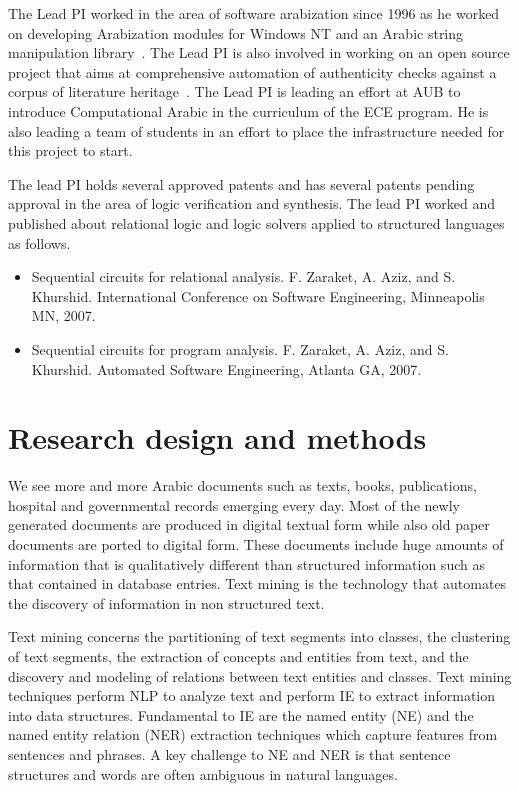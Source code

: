 \documentclass[12pt]{article}
\begin{document}
The Lead PI worked in the area of software arabization since 1996 
as he worked on developing Arabization modules for Windows NT 
and an Arabic string manipulation library~\cite{Zar96}. 
The Lead PI is also involved in working on an open source 
project that aims at comprehensive automation of authenticity 
checks against a corpus of literature heritage~\cite{Zaraket06}.
The Lead PI is leading an effort at AUB to introduce 
Computational Arabic in the curriculum of the ECE program. 
He is also leading a team of students in an effort to place 
the infrastructure needed for this project to start. 

The lead PI holds several approved patents and has several 
patents pending approval in the area of logic verification 
and synthesis.
The lead PI worked and published about relational logic and 
logic solvers applied to structured languages as follows.
\begin{itemize}
\item Sequential circuits for relational analysis. F. Zaraket, A. Aziz, and S. Khurshid. International Conference on Software Engineering, Minneapolis MN, 2007. 
\item Sequential circuits for program analysis. F. Zaraket, A. Aziz, and S. Khurshid. Automated Software Engineering, Atlanta GA, 2007. 
\end{itemize}

\section{Research design and methods}
\label{s:designmethods}

We see more and more Arabic documents such as texts,
books, publications, hospital and governmental records emerging 
every day.
Most of the newly generated documents are produced in digital 
textual form while also old paper documents are ported to digital 
form.
These documents include huge amounts of information that is 
qualitatively different than structured information such as that 
contained in database entries.
Text mining is the technology that automates the discovery of 
information in non structured text.

Text mining concerns the partitioning of text segments 
into classes,
the clustering of text segments,
the extraction of concepts and entities from text,
and the discovery and modeling of relations between text entities 
and classes.
Text mining techniques perform NLP to analyze text and perform 
IE to extract information into data structures.
Fundamental to IE are the named entity (NE) and the named entity 
relation (NER) extraction techniques which capture features from 
sentences and phrases.
A key challenge to NE and NER is that sentence structures and 
words are often ambiguous in natural languages.
\end{document}
